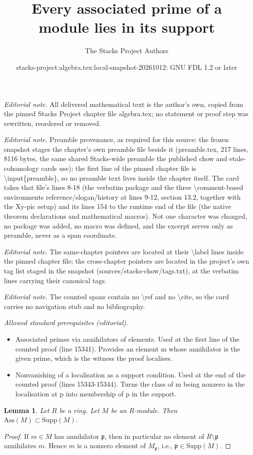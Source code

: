 \documentclass[10pt,a4paper]{amsart}
\title{Every associated prime of a module lies in its support}
\author{The Stacks Project Authors}
\date{stacks-project:algebra.tex:local-snapshot-20261012; GNU FDL 1.2 or later}
\theoremstyle{plain}
\newtheorem{lemma}[subsection]{Lemma}
\theoremstyle{definition}
\theoremstyle{remark}
\numberwithin{equation}{subsection}
\begin{document}
\maketitle
\noindent\textit{Editorial note.} All delivered mathematical text is the author's own, copied from the pinned Stacks Project chapter file algebra.tex; no statement or proof step was rewritten, reordered or removed.\par\medskip
\noindent\textit{Editorial note.} Preamble provenance, as required for this source: the frozen snapshot stages the chapter's own preamble file beside it (preamble.tex, 217 lines, 8116 bytes, the same shared Stacks-wide preamble the published chow and etale-cohomology cards use); the first line of the pinned chapter file is \textbackslash{}input\{preamble\}, so no preamble text lives inside the chapter itself. The card takes that file's lines 8-18 (the verbatim package and the three \textbackslash{}comment-based environments reference/slogan/history at lines 9-12, section 13.2, together with the Xy-pic setup) and its lines 154 to the runtime end of the file (the native theorem declarations and mathematical macros). Not one character was changed, no package was added, no macro was defined, and the excerpt serves only as preamble, never as a span coordinate.\par\medskip
\noindent\textit{Editorial note.} The same-chapter pointers are located at their \textbackslash{}label lines inside the pinned chapter file; the cross-chapter pointers are located in the project's own tag list staged in the snapshot (sources/stacks-chow/tags.txt), at the verbatim lines carrying their canonical tags.\par\medskip
\noindent\textit{Editorial note.} The counted spans contain no \textbackslash{}ref and no \textbackslash{}cite, so the card carries no navigation stub and no bibliography.\par\medskip
\noindent\textit{Allowed standard prerequisites (editorial).}\begin{itemize}
\item Associated primes via annihilators of elements. Used at the first line of the counted proof (line 15341). Provides an element m whose annihilator is the given prime, which is the witness the proof localises.
\item Nonvanishing of a localisation as a support condition. Used at the end of the counted proof (lines 15343-15344). Turns the class of m being nonzero in the localisation at p into membership of p in the support.
\end{itemize}\medskip
\begin{lemma}
\label{lemma-ass-support}
Let $R$ be a ring. Let $M$ be an $R$-module.
Then $\text{Ass}(M) \subset \text{Supp}(M)$.
\end{lemma}

\begin{proof}
If $m \in M$ has annihilator $\mathfrak p$, then in particular
no element of $R \setminus \mathfrak p$ annihilates $m$.
Hence $m$ is a nonzero element of $M_{\mathfrak p}$, i.e.,
$\mathfrak p \in \text{Supp}(M)$.
\end{proof}
\end{document}
